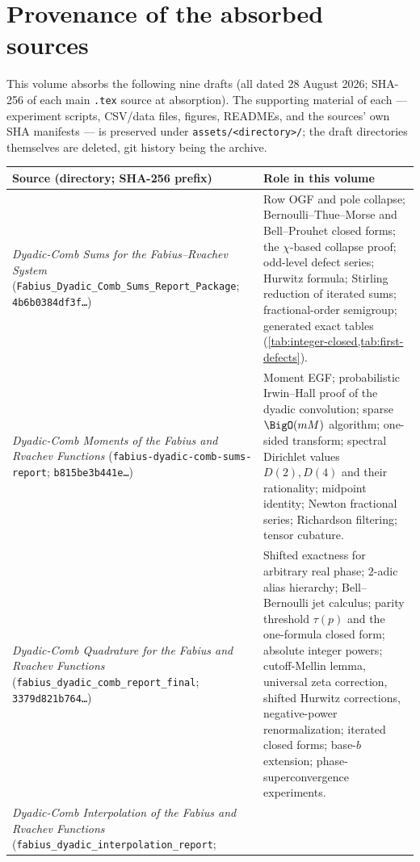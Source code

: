 \documentclass[11pt,oneside]{article}
\numberwithin{equation}{section}
\theoremstyle{definition}
\theoremstyle{remark}
\begin{document}
\section{Provenance of the absorbed sources}
\label{app:provenance}

This volume absorbs the following nine drafts (all dated 28 August
2026; SHA-256 of each main \texttt{.tex} source at absorption).  The
supporting material of each --- experiment scripts, CSV/data files,
figures, READMEs, and the sources' own SHA manifests --- is preserved
under \nolinkurl{assets/<directory>/}; the draft directories
themselves are deleted, git history being the archive.

\begin{center}
\small
\begin{tabular}{@{}p{}p{}@{}}
\toprule
Source (directory; SHA-256 prefix) & Role in this volume \\
\midrule
\emph{Dyadic-Comb Sums for the Fabius--Rvachev System}
(\nolinkurl{Fabius_Dyadic_Comb_Sums_Report_Package};
\texttt{4b6b0384df3f\ldots})
& Row OGF and pole collapse; Bernoulli--Thue--Morse and Bell--Prouhet
closed forms; the $\chi$-based collapse proof; odd-level defect
series; Hurwitz formula; Stirling reduction of iterated sums;
fractional-order semigroup; generated exact tables
(\cref{tab:integer-closed,tab:first-defects}). \\
\addlinespace
\emph{Dyadic-Comb Moments of the Fabius and Rvachev Functions}
(\nolinkurl{fabius-dyadic-comb-sums-report};
\texttt{b815be3b441e\ldots})
& Moment EGF; probabilistic Irwin--Hall proof of the dyadic
convolution; sparse $\BigO(mM)$ algorithm; one-sided transform;
spectral Dirichlet values $D(2),D(4)$ and their rationality;
midpoint identity; Newton fractional series; Richardson filtering;
tensor cubature. \\
\addlinespace
\emph{Dyadic-Comb Quadrature for the Fabius and Rvachev Functions}
(\nolinkurl{fabius_dyadic_comb_report_final};
\texttt{3379d821b764\ldots})
& Shifted exactness for arbitrary real phase; $2$-adic alias
hierarchy; Bell--Bernoulli jet calculus; parity threshold
$\tau(p)$ and the one-formula closed form; absolute integer powers;
cutoff-Mellin lemma, universal zeta correction, shifted Hurwitz
corrections, negative-power renormalization; iterated closed forms;
base-$b$ extension; phase-superconvergence experiments. \\
\addlinespace
\emph{Dyadic-Comb Interpolation of the Fabius and Rvachev Functions}
(\nolinkurl{fabius_dyadic_interpolation_report};

\end{tabular}
\end{center}
\end{document}
